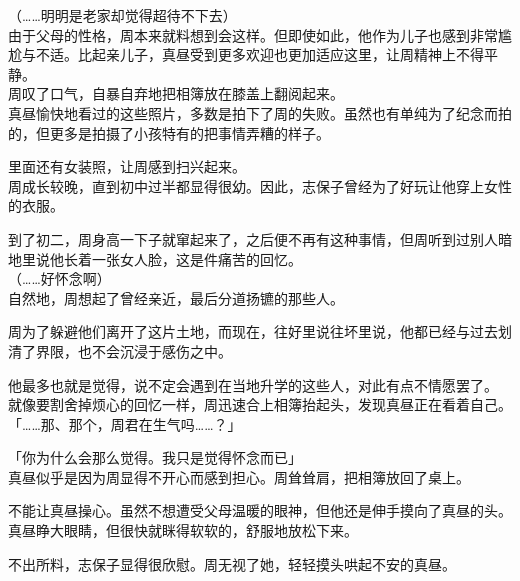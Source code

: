 （……明明是老家却觉得超待不下去）\\

由于父母的性格，周本来就料想到会这样。但即使如此，他作为儿子也感到非常尴尬与不适。比起亲儿子，真昼受到更多欢迎也更加适应这里，让周精神上不得平静。\\

周叹了口气，自暴自弃地把相簿放在膝盖上翻阅起来。\\

真昼愉快地看过的这些照片，多数是拍下了周的失败。虽然也有单纯为了纪念而拍的，但更多是拍摄了小孩特有的把事情弄糟的样子。

里面还有女装照，让周感到扫兴起来。\\

周成长较晚，直到初中过半都显得很幼。因此，志保子曾经为了好玩让他穿上女性的衣服。

到了初二，周身高一下子就窜起来了，之后便不再有这种事情，但周听到过别人暗地里说他长着一张女人脸，这是件痛苦的回忆。\\

（……好怀念啊）\\

自然地，周想起了曾经亲近，最后分道扬镳的那些人。

周为了躲避他们离开了这片土地，而现在，往好里说往坏里说，他都已经与过去划清了界限，也不会沉浸于感伤之中。

他最多也就是觉得，说不定会遇到在当地升学的这些人，对此有点不情愿罢了。\\

就像要割舍掉烦心的回忆一样，周迅速合上相簿抬起头，发现真昼正在看着自己。\\

「……那、那个，周君在生气吗……？」

「你为什么会那么觉得。我只是觉得怀念而已」\\

真昼似乎是因为周显得不开心而感到担心。周耸耸肩，把相簿放回了桌上。

不能让真昼操心。虽然不想遭受父母温暖的眼神，但他还是伸手摸向了真昼的头。\\

真昼睁大眼睛，但很快就眯得软软的，舒服地放松下来。

不出所料，志保子显得很欣慰。周无视了她，轻轻摸头哄起不安的真昼。
